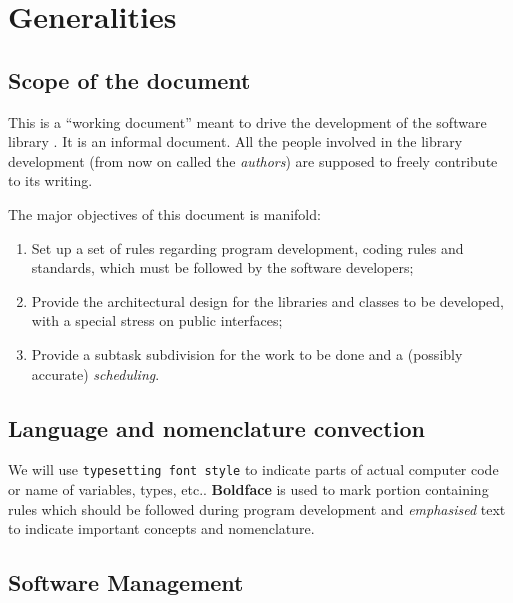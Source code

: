 
\chapter{Generalities}
\label{cha:generalities}

\section{Scope of the document}
\label{sec:scope-document}

This is a ``working document'' meant to drive the development of the
software library \thelibrary. It is an informal document. All the
people involved in the library development (from now on called the
\emph{authors}) are supposed to freely contribute to its writing.

The major objectives of this document is manifold:
\begin{enumerate}
\item Set up a set of rules regarding program development, coding rules
  and standards, which must be followed by the software developers;
\item Provide the architectural design for the libraries and classes
  to be developed, with a special stress on public interfaces;
\item Provide a subtask subdivision for the work to be done and a
  (possibly accurate) \emph{scheduling}.
\end{enumerate}

\section{Language and nomenclature convection}
\label{sec:lang-nomencl-conv}


We will use \texttt{typesetting font style} to indicate parts of
actual computer code or name of variables, types, etc..
\textbf{Boldface} is used to mark portion containing rules which
should be followed during program development and \emph{emphasised}
text to indicate important concepts and nomenclature.

\section{Software Management}
\label{sec:software-management}



